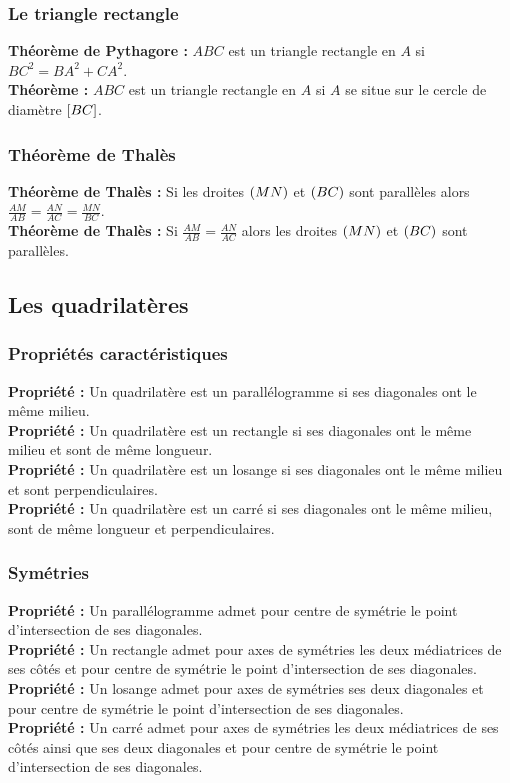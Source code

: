 \documentclass[a4paper,titlepage]{article}
\let\oldleft\left
\renewcommand{\left}{\mathopen{}\mathclose\bgroup\oldleft}
\let\oldright\right
\renewcommand{\right}{\aftergroup\egroup\oldright}
\begin{document}
        \subsubsection{Le triangle rectangle}
            \textbf{Théorème de Pythagore :} $ABC$ est un triangle rectangle en $A$ si $BC^{2}=BA^{2}+CA^{2}$.
            \\
            \textbf{Théorème :} $ABC$ est un triangle rectangle en $A$ si $A$ se situe sur le cercle de diamètre $\left[BC\right]$.
        \subsubsection{Théorème de Thalès}
            \textbf{Théorème de Thalès :} Si les droites $\left(MN\right)$ et $\left(BC\right)$ sont parallèles alors $\frac{AM}{AB}=\frac{AN}{AC}=\frac{MN}{BC}$.
            \\
            \textbf{Théorème de Thalès :} Si $\frac{AM}{AB}=\frac{AN}{AC}$ alors les droites $\left(MN\right)$ et $\left(BC\right)$ sont parallèles.
    \subsection{Les quadrilatères}
        \subsubsection{Propriétés caractéristiques}
            \textbf{Propriété :} Un quadrilatère est un parallélogramme si ses diagonales ont le même milieu.
            \\
            \textbf{Propriété :} Un quadrilatère est un rectangle si ses diagonales ont le même milieu et sont de même longueur.
            \\
            \textbf{Propriété :} Un quadrilatère est un losange si ses diagonales ont le même milieu et sont perpendiculaires.
            \\
            \textbf{Propriété :} Un quadrilatère est un carré si ses diagonales ont le même milieu, sont de même longueur et perpendiculaires.
        \subsubsection{Symétries}
            \textbf{Propriété :} Un parallélogramme admet pour centre de symétrie le point d’intersection de ses diagonales.
            \\
            \textbf{Propriété :} Un rectangle admet pour axes de symétries les deux médiatrices de ses côtés et pour centre de symétrie le point d’intersection de ses diagonales.
            \\
            \textbf{Propriété :} Un losange admet pour axes de symétries ses deux diagonales et pour centre de symétrie le point d’intersection de ses diagonales.
            \\
            \textbf{Propriété :} Un carré admet pour axes de symétries les deux médiatrices de ses côtés ainsi que ses deux diagonales et pour centre de symétrie le point d’intersection de ses diagonales.
\end{document}
